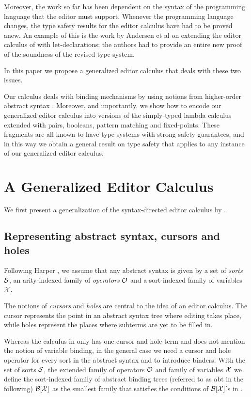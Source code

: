 \documentclass[sigplan,review]{acmart}
\newcommand{\abt}{\textsf{abt}\xspace}
\begin{document}
Moreover, the work so far has been dependent on the syntax of the
programming language that the editor must support. Whenever the
programming language changes, the type safety results for the editor
calculus have had to be proved anew. An example of this is the work by
Andersen et al \cite{10.1145/3587216.3587221} on extending the editor
calculus of \cite{type_safe_structure_editor} with let-declarations;
the authors had to provide an entire new proof of the soundness of the
revised type system.

In this paper we propose a generalized editor calculus that deals with
these two issues.

Our calculus deals with binding mechanisms by using notions from
higher-order abstract syntax \cite{hoas}. Moreover, and importantly,
we show how to encode our generalized editor calculus into versions of
the simply-typed lambda calculus extended with pairs, booleans,
pattern matching and fixed-points. These fragments are all known to
have type systems with strong safety guarantees, and in this way we
obtain a general result on type safety that applies to any instance of
our generalized editor calculus.

\section{A Generalized Editor Calculus}\label{sec:general_editor}

We first present a generalization of the syntax-directed editor
calculus by \cite{type_safe_structure_editor}.

\subsection{Representing abstract syntax, cursors and holes}

Following Harper \cite{harper_foundations}, we assume that any
abstract syntax is given by a set of \emph{sorts} $\mathcal{S}$, an
arity-indexed family of \emph{operators} $\mathcal{O}$ and a sort-indexed
family of variables $\mathcal{X}$.

The notions of \emph{cursors} and \emph{holes} are central to the idea
of an editor calculus. The cursor represents the point in an abstract
syntax tree where editing takes place, while holes represent the
places where subterms are yet to be filled in.

Whereas the calculus in \cite{type_safe_structure_editor} only has one
cursor and hole term and does not mention the notion of variable
binding, in the general case we need a cursor and hole operator for
every sort in the abstract syntax and to introduce binders.  With the
set of sorts $\mathcal{S}$, the extended family of operators $\mathcal{O}$ and
family of variables $\mathcal{X}$ we define the sort-indexed family of
abstract binding trees (referred to as \abt in the following) $\mathcal{B}[\mathcal{X} ]$
as the smallest family that satisfies the conditions of $\mathcal{B}[\mathcal{X} ]$'s in
\cite{harper_foundations}.
\end{document}
